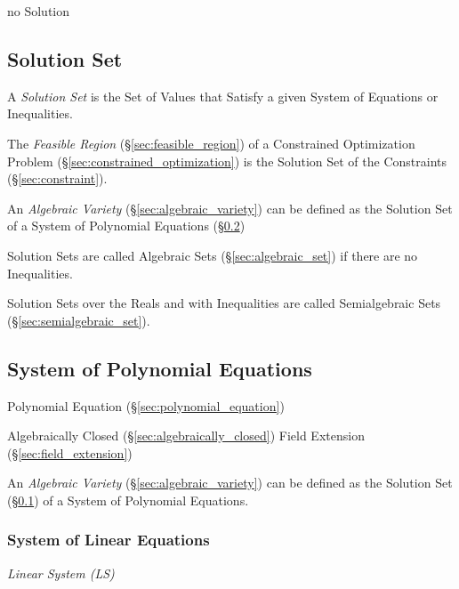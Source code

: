 no Solution



\subsection{Solution Set}\label{sec:solution_set}

A \emph{Solution Set} is the Set of Values that Satisfy a given System of
Equations or Inequalities.

The \emph{Feasible Region} (\S\ref{sec:feasible_region}) of a Constrained
Optimization Problem (\S\ref{sec:constrained_optimization}) is the Solution Set
of the Constraints (\S\ref{sec:constraint}).

An \emph{Algebraic Variety} (\S\ref{sec:algebraic_variety}) can be defined as
the Solution Set of a System of Polynomial Equations
(\S\ref{sec:system_of_polynomials})

Solution Sets are called Algebraic Sets (\S\ref{sec:algebraic_set}) if there
are no Inequalities.

Solution Sets over the Reals and with Inequalities are called Semialgebraic
Sets (\S\ref{sec:semialgebraic_set}).



\subsection{System of Polynomial Equations}\label{sec:system_of_polynomials}

Polynomial Equation (\S\ref{sec:polynomial_equation})

Algebraically Closed (\S\ref{sec:algebraically_closed}) Field
Extension (\S\ref{sec:field_extension})

An \emph{Algebraic Variety} (\S\ref{sec:algebraic_variety}) can be defined as
the Solution Set (\S\ref{sec:solution_set}) of a System of Polynomial Equations.



\subsubsection{System of Linear Equations}
\label{sec:system_of_linear_equations}

\emph{Linear System (LS)}

